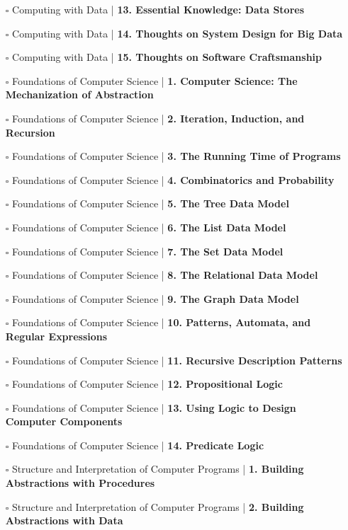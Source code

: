 \documentclass[a4, landscape, 12pt]{article}
\newcommand{\checkbox}{$\square$}%
\begin{document}
\begin{itemize}
{}
\item [\checkbox]  Computing with Data | \textbf{ 13. Essential Knowledge: Data Stores
}
\item [\checkbox]  Computing with Data | \textbf{ 14. Thoughts on System Design for Big Data
}
\item [\checkbox]  Computing with Data | \textbf{ 15. Thoughts on Software Craftsmanship
}
\item [\checkbox]  Foundations of Computer Science | \textbf{ 1. Computer Science: The Mechanization of Abstraction
}
\item [\checkbox]  Foundations of Computer Science | \textbf{ 2. Iteration, Induction, and Recursion
}
\item [\checkbox]  Foundations of Computer Science | \textbf{ 3. The Running Time of Programs
}
\item [\checkbox]  Foundations of Computer Science | \textbf{ 4. Combinatorics and Probability
}
\item [\checkbox]  Foundations of Computer Science | \textbf{ 5. The Tree Data Model
}
\item [\checkbox]  Foundations of Computer Science | \textbf{ 6. The List Data Model
}
\item [\checkbox]  Foundations of Computer Science | \textbf{ 7. The Set Data Model
}
\item [\checkbox]  Foundations of Computer Science | \textbf{ 8. The Relational Data Model
}
\item [\checkbox]  Foundations of Computer Science | \textbf{ 9. The Graph Data Model
}
\item [\checkbox]  Foundations of Computer Science | \textbf{ 10. Patterns, Automata, and Regular Expressions
}
\item [\checkbox]  Foundations of Computer Science | \textbf{ 11. Recursive Description Patterns
}
\item [\checkbox]  Foundations of Computer Science | \textbf{ 12. Propositional Logic
}
\item [\checkbox]  Foundations of Computer Science | \textbf{ 13. Using Logic to Design Computer Components
}
\item [\checkbox]  Foundations of Computer Science | \textbf{ 14. Predicate Logic
}
\item [\checkbox]  Structure and Interpretation of Computer Programs  | \textbf{ 1. Building Abstractions with Procedures
}
\item [\checkbox]  Structure and Interpretation of Computer Programs  | \textbf{ 2. Building Abstractions with Data
}
\end{itemize}
\end{document}
